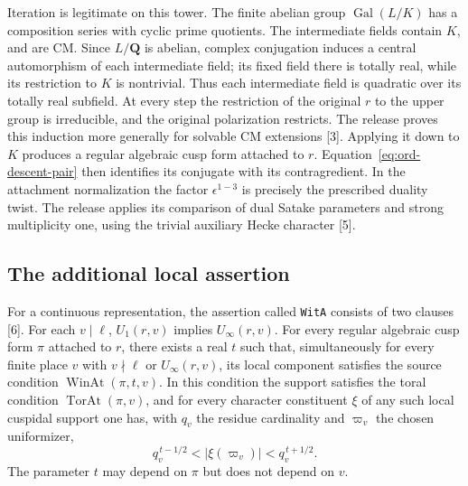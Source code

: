 Iteration is legitimate on this tower. The finite abelian group $\operatorname{Gal}(L/K)$ has a composition series with cyclic prime quotients. The intermediate fields contain $K$, and are CM. Since $L/\mathbf Q$ is abelian, complex conjugation induces a central automorphism of each intermediate field; its fixed field there is totally real, while its restriction to $K$ is nontrivial. Thus each intermediate field is quadratic over its totally real subfield. At every step the restriction of the original $r$ to the upper group is irreducible, and the original polarization restricts. The release proves this induction more generally for solvable CM extensions [3]. Applying it down to $K$ produces a regular algebraic cusp form attached to $r$. Equation~\eqref{eq:ord-descent-pair} then identifies its conjugate with its contragredient. In the attachment normalization the factor $\epsilon^{1-3}$ is precisely the prescribed duality twist. The release applies its comparison of dual Satake parameters and strong multiplicity one, using the trivial auxiliary Hecke character [5].

\subsection{The additional local assertion}

For a continuous representation, the assertion called \texttt{WitA} consists of two clauses [6]. For each $v\mid\ell$, $U_1(r,v)$ implies $U_\infty(r,v)$. For every regular algebraic cusp form $\pi$ attached to $r$, there exists a real $t$ such that, simultaneously for every finite place $v$ with $v\nmid\ell$ or $U_\infty(r,v)$, its local component satisfies the source condition $\operatorname{WinAt}(\pi,t,v)$. In this condition the support satisfies the toral condition $\operatorname{TorAt}(\pi,v)$, and for every character constituent $\xi$ of any such local cuspidal support one has, with $q_v$ the residue cardinality and $\varpi_v$ the chosen uniformizer,
\[
         q_v^{\,t-1/2}<|\xi(\varpi_v)|<q_v^{\,t+1/2}.
\]
The parameter $t$ may depend on $\pi$ but does not depend on $v$.

